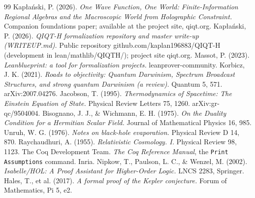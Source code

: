 \documentclass[11pt]{article}
\begin{document}
\begin{thebibliography}{99}
 Kapłański, P. (2026). \emph{One Wave Function, One World: Finite-Information Regional Algebras and the Macroscopic World from Holographic Constraint.} Companion foundations paper; available at the project site, qiqt.org.
 Kapłański, P. (2026). \emph{QIQT-H formalization repository and master write-up (WRITEUP.md).} Public repository github.com/kaplan196883/QIQT-H (development in lean/mathlib/QIQTH/); project site qiqt.org.
 Massot, P. (2023). \emph{Leanblueprint: a tool for formalization projects.} leanprover-community.
 Korbicz, J. K. (2021). \emph{Roads to objectivity: Quantum Darwinism, Spectrum Broadcast Structures, and strong quantum Darwinism (a review).} Quantum 5, 571. arXiv:2007.04276.
 Jacobson, T. (1995). \emph{Thermodynamics of Spacetime: The Einstein Equation of State.} Physical Review Letters 75, 1260. arXiv:gr-qc/9504004.
 Bisognano, J. J., \& Wichmann, E. H. (1975). \emph{On the Duality Condition for a Hermitian Scalar Field.} Journal of Mathematical Physics 16, 985.
 Unruh, W. G. (1976). \emph{Notes on black-hole evaporation.} Physical Review D 14, 870.
 Raychaudhuri, A. (1955). \emph{Relativistic Cosmology. I.} Physical Review 98, 1123.
 The Coq Development Team. \emph{The Coq Reference Manual}, the \texttt{Print Assumptions} command. Inria.
 Nipkow, T., Paulson, L. C., \& Wenzel, M. (2002). \emph{Isabelle/HOL: A Proof Assistant for Higher-Order Logic.} LNCS 2283, Springer.
 Hales, T., et al. (2017). \emph{A formal proof of the Kepler conjecture.} Forum of Mathematics, Pi 5, e2.

\end{thebibliography}
\end{document}
